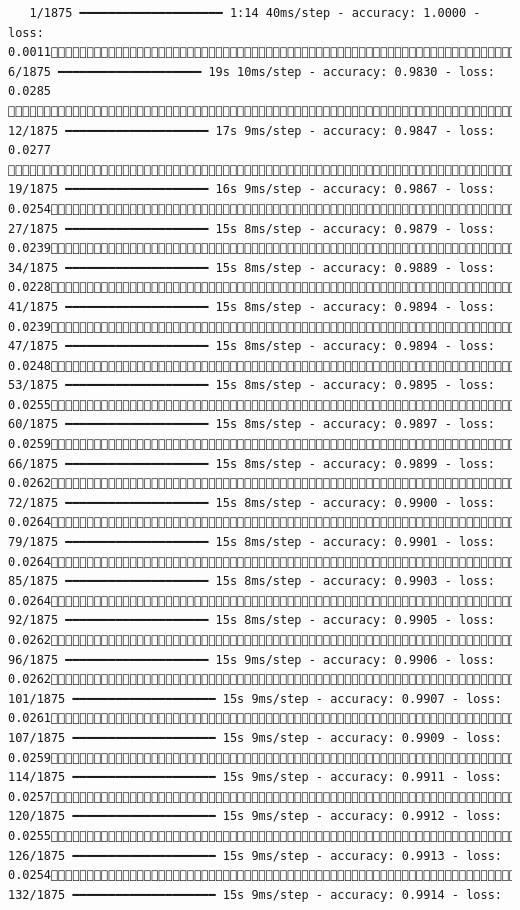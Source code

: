 \documentclass[
  letterpaper,
  DIV=11,
  numbers=noendperiod]{scrreprt}
\begin{document}
\begin{verbatim}
   1/1875 ━━━━━━━━━━━━━━━━━━━━ 1:14 40ms/step - accuracy: 1.0000 - loss: 0.0011   6/1875 ━━━━━━━━━━━━━━━━━━━━ 19s 10ms/step - accuracy: 0.9830 - loss: 0.0285   12/1875 ━━━━━━━━━━━━━━━━━━━━ 17s 9ms/step - accuracy: 0.9847 - loss: 0.0277   19/1875 ━━━━━━━━━━━━━━━━━━━━ 16s 9ms/step - accuracy: 0.9867 - loss: 0.0254  27/1875 ━━━━━━━━━━━━━━━━━━━━ 15s 8ms/step - accuracy: 0.9879 - loss: 0.0239  34/1875 ━━━━━━━━━━━━━━━━━━━━ 15s 8ms/step - accuracy: 0.9889 - loss: 0.0228  41/1875 ━━━━━━━━━━━━━━━━━━━━ 15s 8ms/step - accuracy: 0.9894 - loss: 0.0239  47/1875 ━━━━━━━━━━━━━━━━━━━━ 15s 8ms/step - accuracy: 0.9894 - loss: 0.0248  53/1875 ━━━━━━━━━━━━━━━━━━━━ 15s 8ms/step - accuracy: 0.9895 - loss: 0.0255  60/1875 ━━━━━━━━━━━━━━━━━━━━ 15s 8ms/step - accuracy: 0.9897 - loss: 0.0259  66/1875 ━━━━━━━━━━━━━━━━━━━━ 15s 8ms/step - accuracy: 0.9899 - loss: 0.0262  72/1875 ━━━━━━━━━━━━━━━━━━━━ 15s 8ms/step - accuracy: 0.9900 - loss: 0.0264  79/1875 ━━━━━━━━━━━━━━━━━━━━ 15s 8ms/step - accuracy: 0.9901 - loss: 0.0264  85/1875 ━━━━━━━━━━━━━━━━━━━━ 15s 8ms/step - accuracy: 0.9903 - loss: 0.0264  92/1875 ━━━━━━━━━━━━━━━━━━━━ 15s 8ms/step - accuracy: 0.9905 - loss: 0.0262  96/1875 ━━━━━━━━━━━━━━━━━━━━ 15s 9ms/step - accuracy: 0.9906 - loss: 0.0262 101/1875 ━━━━━━━━━━━━━━━━━━━━ 15s 9ms/step - accuracy: 0.9907 - loss: 0.0261 107/1875 ━━━━━━━━━━━━━━━━━━━━ 15s 9ms/step - accuracy: 0.9909 - loss: 0.0259 114/1875 ━━━━━━━━━━━━━━━━━━━━ 15s 9ms/step - accuracy: 0.9911 - loss: 0.0257 120/1875 ━━━━━━━━━━━━━━━━━━━━ 15s 9ms/step - accuracy: 0.9912 - loss: 0.0255 126/1875 ━━━━━━━━━━━━━━━━━━━━ 15s 9ms/step - accuracy: 0.9913 - loss: 0.0254 132/1875 ━━━━━━━━━━━━━━━━━━━━ 15s 9ms/step - accuracy: 0.9914 - loss: 
\end{verbatim}
\end{document}
